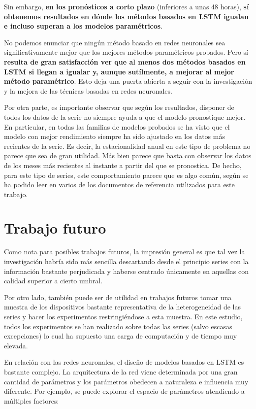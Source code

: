 \documentclass[]{book}
\begin{document}
Sin embargo, \textbf{en los pronósticos a corto plazo} (inferiores a
unas 48 horas), \textbf{sí obtenemos resultados en dónde los métodos
basados en LSTM igualan e incluso superan a los modelos paramétricos}.

No podemos enunciar que ningún método basado en redes neuronales sea
significativamente mejor que los mejores métodos paramétricos probados.
Pero sí \textbf{resulta de gran satisfacción ver que al menos dos
métodos basados en LSTM si llegan a igualar y, aunque sutílmente, a
mejorar al mejor método paramétrico}. Esto deja una puerta abierta a
seguir con la investigación y la mejora de las técnicas basadas en redes
neuronales.

Por otra parte, es importante observar que según los resultados,
disponer de todos los datos de la serie no siempre ayuda a que el modelo
pronostique mejor. En particular, en todas las familias de modelos
probados se ha visto que el modelo con mejor rendimiento siempre ha sido
ajustado en los datos más recientes de la serie. Es decir, la
estacionalidad anual en este tipo de problema no parece que sea de gran
utilidad. Más bien parece que basta con observar los datos de los meses
más recientes al instante a partir del que se pronostica. De hecho, para
este tipo de series, este comportamiento parece que es algo común, según
se ha podido leer en varios de los documentos de referencia utilizados
para este trabajo.

\section{Trabajo futuro}\label{trabajo-futuro}

Como nota para posibles trabajos futuros, la impresión general es que
tal vez la investigación habría sido más sencilla descartando desde el
principio series con la información bastante perjudicada y haberse
centrado únicamente en aquellas con calidad superior a cierto umbral.

Por otro lado, también puede ser de utilidad en trabajos futuros tomar
una muestra de los dispositivos bastante representativa de la
heterogeneidad de las series y hacer los experimentos restringiéndose a
esta muestra. En este estudio, todos los experimentos se han realizado
sobre todas las series (salvo escasas excepciones) lo cual ha supuesto
una carga de computación y de tiempo muy elevada.

En relación con las redes neuronales, el diseño de modelos basados en
LSTM es bastante complejo. La arquitectura de la red viene determinada
por una gran cantidad de parámetros y los parámetros obedecen a
naturaleza e influencia muy diferente. Por ejemplo, se puede explorar el
espacio de parámetros atendiendo a múltiples factores:
\end{document}
